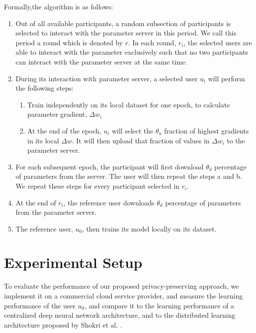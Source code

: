 \documentclass[conference]{IEEEtran}
\begin{document}
Formally,the algorithm is as follows:
\begin {enumerate}
\item Out of all available participants, a random subsection of participants is selected to interact with the parameter server in this
period. We call this period a round which is denoted by $r$. In each round, $r_i$, the selected users are able to interact with the parameter exclusively such that no two
participants can interact with the parameter server at the same time.
\item During its interaction with parameter server, a selected user $u_i$ will perform the following steps:
\begin {enumerate}
  \item Train independently on its local dataset for one epoch, to calculate parameter gradient, $\Delta w_i$ 
  \item  At the end of the epoch, $u_i$ will select the $\theta_u$ fraction of highest gradients in its local $\Delta w$. It will then upload that fraction of values in $\Delta w_i$ to the parameter server.
  \end {enumerate}
\item For each subsequent epoch, the participant will first download $\theta_d$ percentage of parameters from the server. The
user will then repeat the steps a and b. We repeat these steps for every participant selected in $r_i$.
\item At the end of $r_i$, the reference user downloads $\theta_d$ percentage of parameters from the parameter server.
\item The reference user, $u_0$, then trains its model locally on its dataset. 
\end {enumerate}




\section{Experimental Setup}

To evaluate the performance of our proposed privacy-preserving approach, we implement it on a commercial cloud service provider, and measure the
learning performance of the user $u_0$, and compare it to the learning performance of a centralized deep neural network
architecture, and to the distributed learning architecture proposed by Shokri et al. \cite{shokri2015privacy}. 
\end{document}
